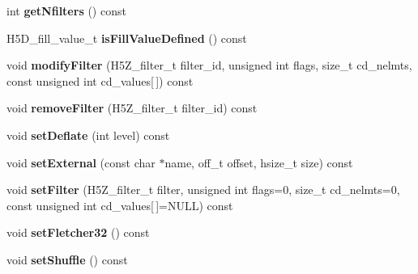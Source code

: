 \begin{DoxyCompactItemize}
int {\bfseries get\+Nfilters} () const
\item 
\mbox{\label{class_h5_1_1_d_set_creat_prop_list_a592f4ce06302bd3a0965457d6e16fb93}} 
H5\+D\+\_\+fill\+\_\+value\+\_\+t {\bfseries is\+Fill\+Value\+Defined} () const
\item 
\mbox{\label{class_h5_1_1_d_set_creat_prop_list_a8529f28494b63f3d90206bcb94ddd1e8}} 
void {\bfseries modify\+Filter} (H5\+Z\+\_\+filter\+\_\+t filter\+\_\+id, unsigned int flags, size\+\_\+t cd\+\_\+nelmts, const unsigned int cd\+\_\+values\mbox{[}$\,$\mbox{]}) const
\item 
\mbox{\label{class_h5_1_1_d_set_creat_prop_list_a19d9c77e3a708f4d47f2f4014226f7d0}} 
void {\bfseries remove\+Filter} (H5\+Z\+\_\+filter\+\_\+t filter\+\_\+id) const
\item 
\mbox{\label{class_h5_1_1_d_set_creat_prop_list_a37a511688501ada6f5d704faad55c35d}} 
void {\bfseries set\+Deflate} (int level) const
\item 
\mbox{\label{class_h5_1_1_d_set_creat_prop_list_a9b382a5d14948c1e91f5d5c88e4eca3d}} 
void {\bfseries set\+External} (const char $\ast$name, off\+\_\+t offset, hsize\+\_\+t size) const
\item 
\mbox{\label{class_h5_1_1_d_set_creat_prop_list_a247215c1a524506e675e7f4ad92b9f5f}} 
void {\bfseries set\+Filter} (H5\+Z\+\_\+filter\+\_\+t filter, unsigned int flags=0, size\+\_\+t cd\+\_\+nelmts=0, const unsigned int cd\+\_\+values\mbox{[}$\,$\mbox{]}=N\+U\+LL) const
\item 
\mbox{\label{class_h5_1_1_d_set_creat_prop_list_a020f96fa3b037cb8b05f069a3ae6a9a8}} 
void {\bfseries set\+Fletcher32} () const
\item 
\mbox{\label{class_h5_1_1_d_set_creat_prop_list_a52be06f37b6470b4cf429651e8138642}} 
void {\bfseries set\+Shuffle} () const
\item 
\mbox{\label{class_h5_1_1_d_set_creat_prop_list_a265a52949f8486027cee3113df9459c9}} 

\end{DoxyCompactItemize}
